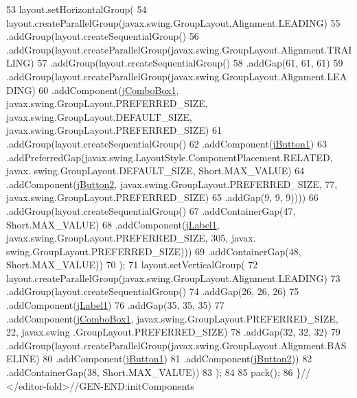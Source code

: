 \begin{DoxyCode}
53         layout.setHorizontalGroup(
54             layout.createParallelGroup(javax.swing.GroupLayout.Alignment.LEADING)
55             .addGroup(layout.createSequentialGroup()
56                 .addGroup(layout.createParallelGroup(javax.swing.GroupLayout.Alignment.TRAILING)
57                     .addGroup(layout.createSequentialGroup()
58                         .addGap(61, 61, 61)
59                         .addGroup(layout.createParallelGroup(javax.swing.GroupLayout.Alignment.LEADING)
60                             .addComponent(\mbox{\hyperlink{classsoftware_1_1elegirvalid_a478fdcb1e161a2c0db069e191d614075}{jComboBox1}}, javax.swing.GroupLayout.PREFERRED\_SIZE, 
      javax.swing.GroupLayout.DEFAULT\_SIZE, javax.swing.GroupLayout.PREFERRED\_SIZE)
61                             .addGroup(layout.createSequentialGroup()
62                                 .addComponent(\mbox{\hyperlink{classsoftware_1_1elegirvalid_a2e45ed3b1ed8951950588a561e23a890}{jButton1}})
63                                 .addPreferredGap(javax.swing.LayoutStyle.ComponentPlacement.RELATED, javax.
      swing.GroupLayout.DEFAULT\_SIZE, Short.MAX\_VALUE)
64                                 .addComponent(\mbox{\hyperlink{classsoftware_1_1elegirvalid_a9923ae8164e7886f8cf993f534e932ad}{jButton2}}, javax.swing.GroupLayout.PREFERRED\_SIZE, 77,
       javax.swing.GroupLayout.PREFERRED\_SIZE)
65                                 .addGap(9, 9, 9))))
66                     .addGroup(layout.createSequentialGroup()
67                         .addContainerGap(47, Short.MAX\_VALUE)
68                         .addComponent(\mbox{\hyperlink{classsoftware_1_1elegirvalid_a77ded24e7c4de4317d1e1ea4dea875e6}{jLabel1}}, javax.swing.GroupLayout.PREFERRED\_SIZE, 305, javax.
      swing.GroupLayout.PREFERRED\_SIZE)))
69                 .addContainerGap(48, Short.MAX\_VALUE))
70         );
71         layout.setVerticalGroup(
72             layout.createParallelGroup(javax.swing.GroupLayout.Alignment.LEADING)
73             .addGroup(layout.createSequentialGroup()
74                 .addGap(26, 26, 26)
75                 .addComponent(\mbox{\hyperlink{classsoftware_1_1elegirvalid_a77ded24e7c4de4317d1e1ea4dea875e6}{jLabel1}})
76                 .addGap(35, 35, 35)
77                 .addComponent(\mbox{\hyperlink{classsoftware_1_1elegirvalid_a478fdcb1e161a2c0db069e191d614075}{jComboBox1}}, javax.swing.GroupLayout.PREFERRED\_SIZE, 22, javax.swing
      .GroupLayout.PREFERRED\_SIZE)
78                 .addGap(32, 32, 32)
79                 .addGroup(layout.createParallelGroup(javax.swing.GroupLayout.Alignment.BASELINE)
80                     .addComponent(\mbox{\hyperlink{classsoftware_1_1elegirvalid_a2e45ed3b1ed8951950588a561e23a890}{jButton1}})
81                     .addComponent(\mbox{\hyperlink{classsoftware_1_1elegirvalid_a9923ae8164e7886f8cf993f534e932ad}{jButton2}}))
82                 .addContainerGap(38, Short.MAX\_VALUE))
83         );
84 
85         pack();
86     \}\textcolor{comment}{// </editor-fold>//GEN-END:initComponents}
\end{DoxyCode}
